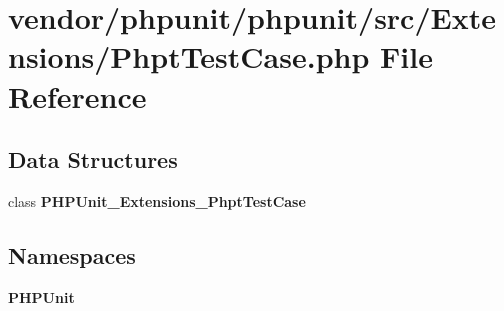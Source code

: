 \section{vendor/phpunit/phpunit/src/\+Extensions/\+Phpt\+Test\+Case.php File Reference}
\label{_phpt_test_case_8php}
\subsection*{Data Structures}
\begin{DoxyCompactItemize}
\item 
class {\bf P\+H\+P\+Unit\+\_\+\+Extensions\+\_\+\+Phpt\+Test\+Case}
\end{DoxyCompactItemize}
\subsection*{Namespaces}
\begin{DoxyCompactItemize}
\item 
 {\bf P\+H\+P\+Unit}
\end{DoxyCompactItemize}
